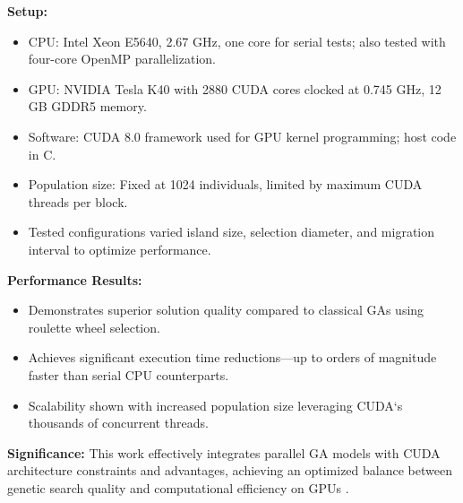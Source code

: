 \documentclass{article}
\begin{document}
\item \textbf{Setup:}
\begin{itemize}
    \item CPU: Intel Xeon E5640, 2.67 GHz, one core for serial tests; also tested with four-core OpenMP parallelization.
    \item GPU: NVIDIA Tesla K40 with 2880 CUDA cores clocked at 0.745 GHz, 12 GB GDDR5 memory.
    \item Software: CUDA 8.0 framework used for GPU kernel programming; host code in C.
    \item Population size: Fixed at 1024 individuals, limited by maximum CUDA threads per block.
    \item Tested configurations varied island size, selection diameter, and migration interval to optimize performance.
\end{itemize}

\item \textbf{Performance Results:}
\begin{itemize}
    \item Demonstrates superior solution quality compared to classical GAs using roulette wheel selection.
    \item Achieves significant execution time reductions—up to orders of magnitude faster than serial CPU counterparts.
    \item Scalability shown with increased population size leveraging CUDA`s thousands of concurrent threads.
\end{itemize}

\item \textbf{Significance:} This work effectively integrates parallel GA models with CUDA architecture constraints and advantages, achieving an optimized balance between genetic search quality and computational efficiency on GPUs \cite{luo2018acceleration}.




\end{document}
